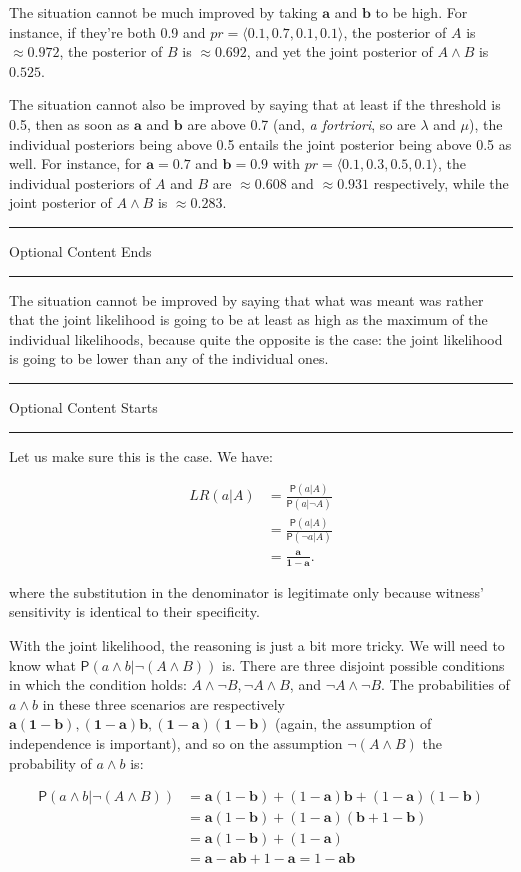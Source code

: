 \documentclass[10pt,dvipsnames,enabledeprecatedfontcommands]{scrartcl}
\newcommand{\ra}{\rangle}
\newcommand{\la}{\langle}
\newcommand{\n}{\neg}
\newcommand{\et}{\wedge}
\newcommand{\pr}[1]{\mathsf{P}(#1)}
\newcommand{\intermezzoa}{
	\begin{minipage}[c]{13cm}
	\begin{center}\rule{10cm}{0.4pt}



	\tiny{\sc Optional Content Starts}
	
	\vspace{-1mm}
	
	\rule{10cm}{0.4pt}\end{center}
	\end{minipage}\nopagebreak 
	}
\newcommand{\intermezzob}{\nopagebreak 
	\begin{minipage}[c]{13cm}
	\begin{center}\rule{10cm}{0.4pt}

	\tiny{\sc Optional Content Ends}
	
	\vspace{-1mm}
	
	\rule{10cm}{0.4pt}\end{center}
	\end{minipage}
	}
\begin{document}
The situation cannot be much improved by taking \(\mathbf{a}\) and
\(\mathbf{b}\) to be high. For instance, if they're both 0.9 and
\(pr=\la0.1, 0.7, 0.1, 0.1 \ra\), the posterior of \(A\) is
\(\approx 0.972\), the posterior of \(B\) is \(\approx 0.692\), and yet
the joint posterior of \(A\et B\) is \(0.525\).

The situation cannot also be improved by saying that at least if the
threshold is 0.5, then as soon as \(\mathbf{a}\) and \(\mathbf{b}\) are
above 0.7 (and, \emph{a fortriori}, so are \(\lambda\) and \(\mu\)), the
individual posteriors being above 0.5 entails the joint posterior being
above 0.5 as well. For instance, for \(\mathbf{a}=0.7\) and
\(\mathbf{b}=0.9\) with \(pr= \la 0.1, 0.3, 0.5, 0.1\ra\), the
individual posteriors of \(A\) and \(B\) are \(\approx 0.608\) and
\(\approx 0.931\) respectively, while the joint posterior of \(A\et B\)
is \(\approx 0.283\).

\intermezzob

The situation cannot be improved by saying that what was meant was
rather that the joint likelihood is going to be at least as high as the
maximum of the individual likelihoods, because quite the opposite is the
case: the joint likelihood is going to be lower than any of the
individual ones.

\intermezzoa

Let us make sure this is the case. We have:

\begin{align*}
 LR(a\vert A) & = \frac{\pr{a\vert A}}{\pr{a\vert \n A}}\\
 &= \frac{\pr{a\vert A}}{\pr{\n a\vert  A}} \\
& =  \frac{\mathbf{a}}{\mathbf{1-a}}.
\end{align*}

where the substitution in the denominator is legitimate only because
witness' sensitivity is identical to their specificity.

With the joint likelihood, the reasoning is just a bit more tricky. We
will need to know what \(\pr{a\et b \vert \n (A\et B)}\) is. There are
three disjoint possible conditions in which the condition holds:
\(A\et \n B, \n A \et B\), and \(\n A \et \n B\). The probabilities of
\(a\et b\) in these three scenarios are respectively
\(\mathbf{a(1-b),(1-a)b,(1-a)(1-b)}\) (again, the assumption of
independence is important), and so on the assumption \(\n(A\et B)\) the
probability of \(a\et b\) is:

\begin{align*}
\pr{a\et b \vert \n (A\et B)} & = 
\mathbf{a}(1-\mathbf{b})+(1-\mathbf{a})\mathbf{b}+(1-\mathbf{a})(1-\mathbf{b})\\ 
& = 
\mathbf{a}(1-\mathbf{b})+(1-\mathbf{a})(\mathbf{b} + 1-\mathbf{b})\\
& = \mathbf{a}(1-\mathbf{b})+(1-\mathbf{a})\\
& = \mathbf{a}-\mathbf{a}\mathbf{b}+1-\mathbf{a} = 1- \mathbf{a}\mathbf{b}
\end{align*}
\end{document}
